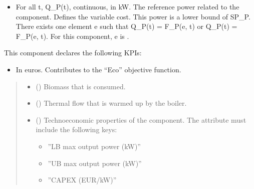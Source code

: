 \documentclass[letterpaper,10pt,english]{sphinxmanual}
\begin{document}
\begin{fulllineitems}
\begin{fulllineitems}
\begin{itemize}
\item {} 
\sphinxAtStartPar
For all t, Q\_P(t), continuous, in kW.
The reference power related to the component. Defines the variable cost.
This power is a lower bound of SP\_P.
There exists one element e such that Q\_P(t) = F\_P(e, t) or Q\_P(t) = \sphinxhyphen{} F\_P(e, t).
For this component, e is .

\end{itemize}

\sphinxAtStartPar
This component declares the following KPIs:
\begin{itemize}
\item {} 
\sphinxAtStartPar
{}
In euros.
Contributes to the “Eco” objective function.

\end{itemize}
\begin{quote}\begin{description}
\begin{itemize}
\item {} 
\sphinxAtStartPar
{} ({\hyperref[\detokenize{generated/tamos.element.FuelVector:tamos.element.FuelVector}]{}}) \textendash{} Biomass that is consumed.

\item {} 
\sphinxAtStartPar
{} () \textendash{} Thermal flow that is warmed up by the boiler.

\item {} 
\sphinxAtStartPar
{} (\sphinxstyleliteralemphasis{\sphinxupquote{ | }}) \textendash{} 
\sphinxAtStartPar
Techno\sphinxhyphen{}economic properties of the component.
The  attribute must include the following keys:
\begin{itemize}
\item {} 
\sphinxAtStartPar
”LB max output power (kW)”

\item {} 
\sphinxAtStartPar
”UB max output power (kW)”

\item {} 
\sphinxAtStartPar
”CAPEX (EUR/kW)”


\end{itemize}
\end{itemize}
\end{description}
\end{quote}
\end{fulllineitems}
\end{fulllineitems}
\end{document}
